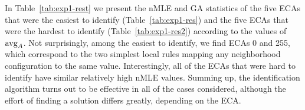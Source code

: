 \begin{table}[ht]
	\centering
	\caption{Experiment 1: Results of the two-sided Mann--Whitney $U$ test of $\avg_A$ grouped according to Wolfram's classification scheme~\protect{} and the nMLE~\protect{}.}\label{tab:mannwhitney}
	\quad
\end{table}

In Table~\ref{tab:exp1-rest} we present the nMLE and GA statistics of the five ECAs that were the easiest to identify (Table~\ref{tab:exp1-res}) and the five ECAs that were the hardest to identify (Table~\ref{tab:exp1-res2}) according to the values of $\avg_A$. Not surprisingly, among the easiest to identify, we find ECAs 0 and 255, which correspond to the two simplest local rules mapping any neighborhood configuration to the same value. Interestingly, all of the ECAs that were hard to identify have similar relatively high nMLE values. Summing up, the identification algorithm turns out to be effective in all of the cases considered, although the effort of finding a solution differs greatly, depending on the ECA.

